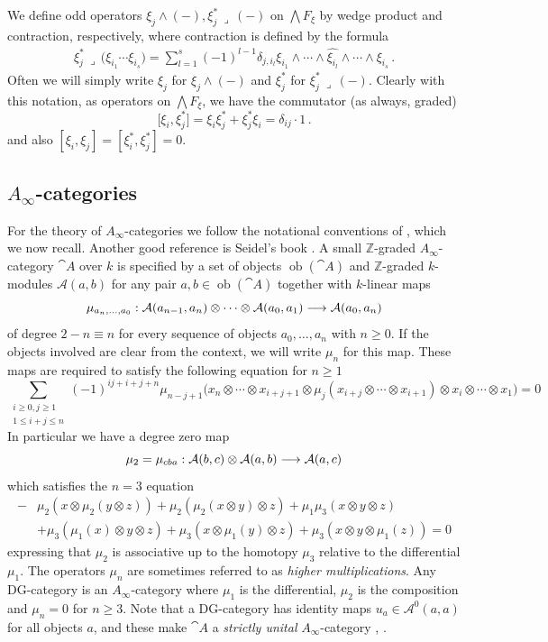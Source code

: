 \documentclass[english,letter paper,12pt,leqno]{article}
\theoremstyle{example}
\numberwithin{equation}{section}
\def\AA{\mathcal{A}}
\def\be{\begin{equation}}
\def\ee{\end{equation}}
\def\nZ{\mathds{Z}}
\begin{document}
We define odd operators $\xi_j \wedge (-), \xi_j^* \,\lrcorner\, (-)$ on $\bigwedge F_\xi$ by wedge product and contraction, respectively, where contraction is defined by the formula
\begin{align*}
\xi_j^* \,\lrcorner\, \Big( \xi_{i_1} \cdots \xi_{i_s} \Big) = \sum_{l=1}^s (-1)^{l-1} \delta_{j, i_l} \xi_{i_1} \wedge \cdots \wedge \widehat{ \xi_{i_l} } \wedge \cdots \wedge \xi_{i_s}\,.
\end{align*}
Often we will simply write $\xi_j$ for $\xi_j \wedge (-)$ and $\xi_j^*$ for $\xi_j^* \,\lrcorner\, (-)$. Clearly with this notation, as operators on $\bigwedge F_\xi$, we have the commutator (as always, graded)
\be\label{eq:wedge_contract_comm}
\big[ \xi_i, \xi_j^* \big] = \xi_i \xi_j^* + \xi_j^* \xi_i = \delta_{ij} \cdot 1\,.
\ee
and also $[ \xi_i, \xi_j ] = [\xi_i^*, \xi_j^*] = 0$.

\subsection{$A_\infty$-categories}\label{section:ainfcat}

For the theory of $A_\infty$-categories we follow the notational conventions of \cite[\S 2]{lazaroiu}, which we now recall. Another good reference is Seidel's book \cite{seidel}. A small $\nZ$-graded $A_\infty$-category $\cat{A}$ over $k$ is specified by a set of objects $\operatorname{ob}(\cat{A})$ and $\nZ$-graded $k$-modules $\AA(a,b)$ for any pair $a,b \in \operatorname{ob}(\cat{A})$ together with $k$-linear maps
\[
\mu_{a_n,\ldots,a_0}: \AA(a_{n-1}, a_n) \otimes \cdots \otimes \AA(a_0, a_1) \lto \AA(a_0,a_n)
\]
of degree $2 - n \equiv n$ for every sequence of objects $a_0,\ldots,a_n$ with $n \ge 0$. If the objects involved are clear from the context, we will write $\mu_n$ for this map. These maps are required to satisfy the following equation for $n \ge 1$
\be\label{eq_ainf_constraints}
\sum_{\substack{i \ge 0, j \ge 1 \\ 1 \le i + j \le n}} (-1)^{ij + i + j + n} \mu_{n-j+1}\Big( x_n \otimes \cdots \otimes x_{i+j+1} \otimes \mu_j( x_{i+j} \otimes \cdots \otimes x_{i+1} ) \otimes x_i \otimes \cdots \otimes x_1 \Big) = 0
\ee
In particular we have a degree zero map
\[
\mu_2 = \mu_{cba}: \AA(b,c) \otimes \AA(a,b) \lto \AA(a,c)
\]
which satisfies the $n = 3$ equation
\begin{align*}
- &\mu_2( x \otimes \mu_2( y \otimes z ) ) + \mu_2( \mu_2( x \otimes y ) \otimes z ) + \mu_1 \mu_3( x \otimes y \otimes z )\\
& + \mu_3( \mu_1(x) \otimes y \otimes z ) + \mu_3( x \otimes \mu_1(y) \otimes z ) + \mu_3( x \otimes y \otimes \mu_1(z) ) = 0
\end{align*}
expressing that $\mu_2$ is associative up to the homotopy $\mu_3$ relative to the differential $\mu_1$. The operators $\mu_n$ are sometimes referred to as \emph{higher multiplications}. Any DG-category is an $A_\infty$-category where $\mu_1$ is the differential, $\mu_2$ is the composition and $\mu_n = 0$ for $n \ge 3$. Note that a DG-category has identity maps $u_a \in \AA^0(a,a)$ for all objects $a$, and these make $\cat{A}$ a \emph{strictly unital} $A_\infty$-category \cite[\S 2.1]{lazaroiu}, \cite[\S I.2]{seidel}.
\end{document}

